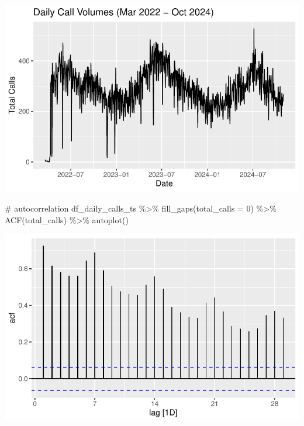 \documentclass[
  letterpaper,
  DIV=11,
  numbers=noendperiod]{scrartcl}
\newenvironment{Shaded}{\begin{snugshade}}{\end{snugshade}}
\newcommand{\AttributeTok}[1]{\textcolor[rgb]{0.40,0.45,0.13}{#1}}
\newcommand{\CommentTok}[1]{\textcolor[rgb]{0.37,0.37,0.37}{#1}}
\newcommand{\DecValTok}[1]{\textcolor[rgb]{0.68,0.00,0.00}{#1}}
\newcommand{\FunctionTok}[1]{\textcolor[rgb]{0.28,0.35,0.67}{#1}}
\newcommand{\NormalTok}[1]{\textcolor[rgb]{0.00,0.23,0.31}{#1}}
\newcommand{\SpecialCharTok}[1]{\textcolor[rgb]{0.37,0.37,0.37}{#1}}
\begin{document}
\includegraphics{final_proj_group1_files/figure-pdf/daily-1.pdf}

\begin{Shaded}
\begin{Highlighting}[]
\CommentTok{\# autocorrelation}
\NormalTok{df\_daily\_calls\_ts }\SpecialCharTok{\%\textgreater{}\%}
  \FunctionTok{fill\_gaps}\NormalTok{(}\AttributeTok{total\_calls =} \DecValTok{0}\NormalTok{) }\SpecialCharTok{\%\textgreater{}\%}
  \FunctionTok{ACF}\NormalTok{(total\_calls) }\SpecialCharTok{\%\textgreater{}\%}
  \FunctionTok{autoplot}\NormalTok{()}
\end{Highlighting}
\end{Shaded}

\includegraphics{final_proj_group1_files/figure-pdf/daily-2.pdf}
\end{document}

